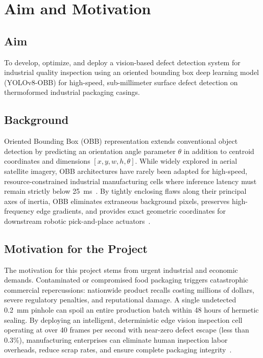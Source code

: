 \section{Aim and Motivation}
\label{sec:aim}

\subsection{Aim}
\label{subsec:aim}

To develop, optimize, and deploy a vision-based defect detection system for industrial quality inspection using an oriented bounding box deep learning model (YOLOv8-OBB) for high-speed, sub-millimeter surface defect detection on thermoformed industrial packaging casings.

\subsection{Background}
\label{subsec:aimbackground}

Oriented Bounding Box (OBB) representation extends conventional object detection by predicting an orientation angle parameter $\theta$ in addition to centroid coordinates and dimensions $[x, y, w, h, \theta]$. While widely explored in aerial satellite imagery, OBB architectures have rarely been adapted for high-speed, resource-constrained industrial manufacturing cells where inference latency must remain strictly below 25~ms~\cite{wang2024rgs,huang2026msfe}. By tightly enclosing flaws along their principal axes of inertia, OBB eliminates extraneous background pixels, preserves high-frequency edge gradients, and provides exact geometric coordinates for downstream robotic pick-and-place actuators~\cite{zhang2024robotic}.

\subsection{Motivation for the Project}
\label{subsec:motivation}

The motivation for this project stems from urgent industrial and economic demands. Contaminated or compromised food packaging triggers catastrophic commercial repercussions: nationwide product recalls costing millions of dollars, severe regulatory penalties, and reputational damage. A single undetected 0.2~mm pinhole can spoil an entire production batch within 48 hours of hermetic sealing. By deploying an intelligent, deterministic edge vision inspection cell operating at over 40 frames per second with near-zero defect escape (less than 0.3\%), manufacturing enterprises can eliminate human inspection labor overheads, reduce scrap rates, and ensure complete packaging integrity~\cite{meng2024automated,sun2026edgedeployable}.

